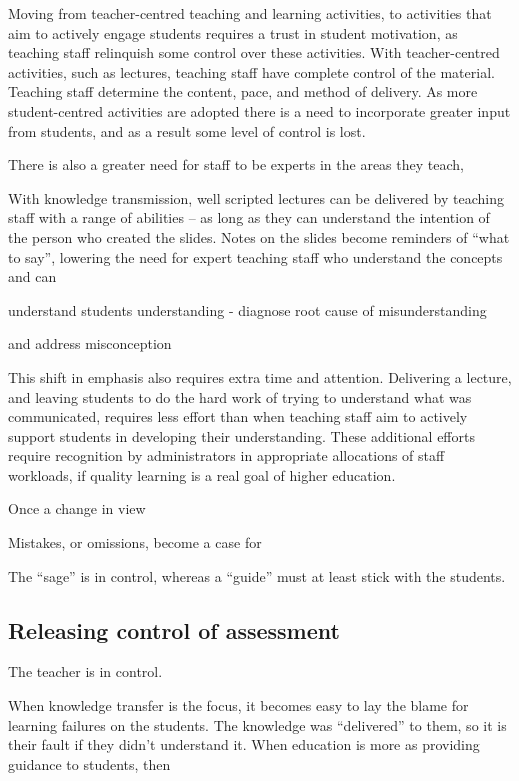 Moving from teacher-centred teaching and learning activities, to activities that aim to actively engage students requires a trust in student motivation, as teaching staff relinquish some control over these activities. With teacher-centred activities, such as lectures, teaching staff have complete control of the material. Teaching staff determine the content, pace, and method of delivery. As more student-centred activities are adopted there is a need to incorporate greater input from students, and as a result some level of control is lost. 


There is also a greater need for staff to be experts in the areas they teach,

With knowledge transmission, well scripted lectures can be delivered by teaching staff with a range of abilities -- as long as they can understand the intention of the person who created the slides. Notes on the slides become reminders of ``what to say'', lowering the need for expert teaching staff who understand the concepts and can 

understand students understanding - diagnose root cause of misunderstanding 

and address misconception

This shift in emphasis also requires extra time and attention. Delivering a lecture, and leaving students to do the hard work of trying to understand what was communicated, requires less effort than when teaching staff aim to actively support students in developing their understanding. These additional efforts require recognition by administrators in appropriate allocations of staff workloads, if quality learning is a real goal of higher education.

Once a change in view

Mistakes, or omissions, become a case for  


 

 The ``sage'' is in control, whereas a ``guide'' must at least stick with the students.


\subsection{Releasing control of assessment} %
\label{sub:releasing_control_of_assessment}

The teacher is in control.

When knowledge transfer is the focus, it becomes easy to lay the blame for learning failures on the students. The knowledge was ``delivered'' to them, so it is their fault if they didn't understand it. When education is more as providing guidance to students, then 

